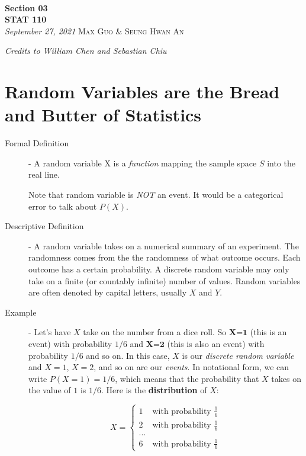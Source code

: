 \documentclass[11pt]{article}
\theoremstyle{definition}
\theoremstyle{remark}
\newcommand{\inserttitle}{Section 03}
\newcommand{\insertauthor}{Max Guo \& Seung Hwan An}
\newcommand{\insertcourse}{STAT 110}
\begin{document}
{\noindent\Huge\bf  \\[0.1\baselineskip] {\inserttitle }}\\[2\baselineskip]
{{\bf \insertcourse}\\ {\textit{September 27, 2021}}} \hfill {\large \textsc{\insertauthor}}
\smallskip

\hfill \noindent \textit{Credits to William Chen and Sebastian Chiu}


\section{Random Variables are the Bread and Butter of Statistics}
\begin{description}
	\item[Formal Definition] - A random variable X is a \emph{function} mapping the sample space $S$ into the real line.
	
	\Biohazard Note that random variable is \textit{NOT} an event. It would be a categorical error to talk about $P(X)$.
	
	\item[Descriptive Definition] - A random variable takes on a numerical summary of an experiment. The randomness comes from the the randomness of what outcome occurs. Each outcome has a certain probability. A discrete random variable may only take on a finite (or countably infinite) number of values. Random variables are often denoted by capital letters, usually $X$ and $Y$.
	\item[Example] - Let's have $X$ take on the number from a dice roll. So $\textbf{X=1}$ (this is an event) with probability $1/6$ and $\textbf{X=2}$ (this is also an event) with probability $1/6$ and so on. In this case, $X$ is our \emph{discrete random variable} and  $X=1$, $X=2$, and so on are our \emph{events}. In notational form, we can write $P(X=1) = 1/6$, which means that the probability that $X$ takes on the value of $1$ is $1/6$. Here is the \textbf{distribution} of $X$: 

\[
X =
 \begin{cases}
   1 & \text{with probability }\frac{1}{6} \\
   2 & \text{with probability }\frac{1}{6} \\
... \\
   6 & \text{with probability }\frac{1}{6}
  \end{cases}
\]


\end{description}
\end{document}
